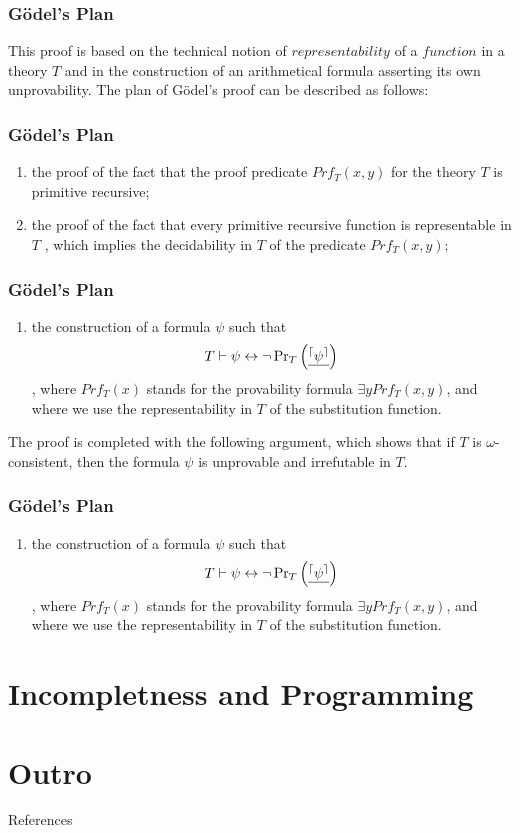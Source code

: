 \documentclass[aspectratio=169]{beamer}
\begin{document}
\begin{frame}
	\frametitle{Gödel's Plan}
	This proof is based on the technical notion of $representability$ of a $function$ in a theory $T$ and in the construction of an arithmetical formula asserting its own unprovability. The plan of Gödel's proof can be described as follows: \cite{bekl}
\end{frame}

\begin{frame}
	\frametitle{Gödel's Plan}
	\begin{enumerate}
		\item the proof of the fact that the proof predicate $Prf_T (x, y) $ for the theory $T$ is primitive recursive;
		\item the proof of the fact that every primitive recursive function is representable in $T$ , which implies the decidability in $T$ of the predicate $Prf_T (x, y);$
	\end{enumerate}
\end{frame}

\begin{frame}
	\frametitle{Gödel's Plan}
	\begin{enumerate}
		\item the construction of a formula $\psi$ such that
		\[ T \vdash \psi \leftrightarrow \neg \operatorname{Pr}_{T}\left(\text{\underline{$^{\lceil} \psi^{\rceil}$}}\right) \]
		, where $Prf_T(x)$ stands for the provability formula $\exists y Prf_{T}(x, y)$, and where we
		use the representability in $T$ of the substitution function.
	\end{enumerate}
	The proof is completed with the following argument, which shows that if $T$ is $\omega$-consistent, then the formula $\psi$ is unprovable and irrefutable in $T$.
	\begin{flushright}
		\cite{bekl}
	\end{flushright}
\end{frame}

\begin{frame}
	\frametitle{Gödel's Plan}
	\begin{enumerate}
		\item the construction of a formula $\psi$ such that
		\[ T \vdash \psi \leftrightarrow \neg \operatorname{Pr}_{T}\left(\text{\underline{$^{\lceil} \psi^{\rceil}$}}\right) \]
		, where $Prf_T(x)$ stands for the provability formula $\exists y Prf_{T}(x, y)$, and where we
		use the representability in $T$ of the substitution function.
	\end{enumerate}
	\begin{flushright}
		\cite{bekl}
	\end{flushright}
\end{frame}

\section{Incompletness and Programming}
\section{Outro}
\begin{frame}{References}
    
    
\end{frame}
\end{document}
